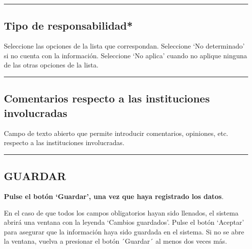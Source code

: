 \documentclass[
]{book}
\begin{document}
\begin{center}\rule{0.5\linewidth}{0.5pt}\end{center}

\hypertarget{tipo-de-responsabilidad}{%
\subsection*{\texorpdfstring{{Tipo de responsabilidad*}}{Tipo de responsabilidad*}}\label{tipo-de-responsabilidad}}

Seleccione las opciones de la lista que correspondan.
Seleccione `No determinado' si no cuenta con la información.
Seleccione `No aplica' cuando no aplique ninguna de las otras opciones de la lista.

\begin{center}\rule{0.5\linewidth}{0.5pt}\end{center}

\hypertarget{comentarios-respecto-a-las-instituciones-involucradas}{%
\subsection*{Comentarios respecto a las instituciones involucradas}\label{comentarios-respecto-a-las-instituciones-involucradas}}

Campo de texto abierto que permite introducir comentarios, opiniones, etc. respecto a las instituciones involucradas.

\begin{center}\rule{0.5\linewidth}{0.5pt}\end{center}

\hypertarget{guardar-2}{%
\subsection*{GUARDAR}\label{guardar-2}}

\textbf{Pulse el botón `Guardar', una vez que haya registrado los datos}.

En el caso de que todos los campos obligatorios hayan sido llenados, el sistema abrirá una ventana con la leyenda `Cambios guardados'. Pulse el botón `Aceptar' para asegurar que la información haya sido guardada en el sistema. Si no se abre la ventana, vuelva a presionar el botón ´Guardar´ al menos dos veces más.
\end{document}
